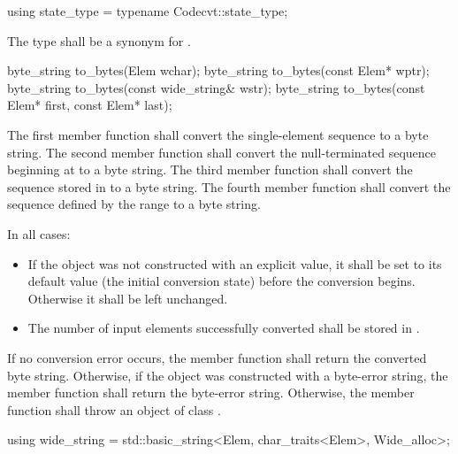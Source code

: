 %
%
\begin{itemdecl}
using state_type = typename Codecvt::state_type;
\end{itemdecl}

\begin{itemdescr}
\pnum
The type shall be a synonym for .
\end{itemdescr}

%
%
\begin{itemdecl}
byte_string to_bytes(Elem wchar);
byte_string to_bytes(const Elem* wptr);
byte_string to_bytes(const wide_string& wstr);
byte_string to_bytes(const Elem* first, const Elem* last);
\end{itemdecl}

\begin{itemdescr}
\pnum
\effects
The first member function shall convert the single-element sequence  to a byte string.
The second member function shall convert the null-terminated sequence beginning at  to
a byte string. The third member function shall convert the sequence stored in  to a
byte string. The fourth member function shall convert the sequence defined by the
range  to a byte string.

\pnum
In all cases:

\begin{itemize}
\item If the  object was not constructed with an explicit value, it
shall be
set to its default value (the initial conversion state) before the
conversion begins. Otherwise it shall be left unchanged.
\item The number of input elements successfully converted shall be stored
in .
\end{itemize}

\pnum
\returns
If no conversion error occurs, the member function shall return the converted byte string.
Otherwise, if the object was constructed with a byte-error string, the
member function shall return the byte-error string.
Otherwise, the member function shall throw an object of class .
\end{itemdescr}

%
%
\begin{itemdecl}
using wide_string = std::basic_string<Elem, char_traits<Elem>, Wide_alloc>;
\end{itemdecl}


